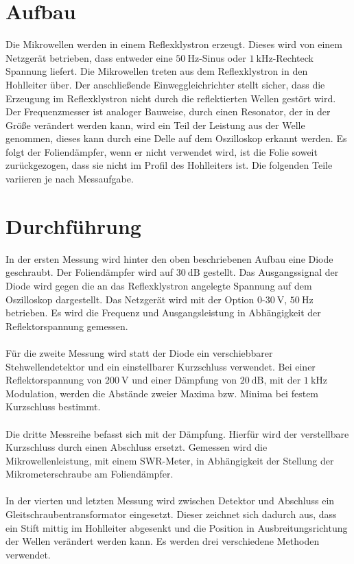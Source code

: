 \section{Aufbau}
\label{sec:Aufbau}
Die Mikrowellen werden in einem Reflexklystron erzeugt.
Dieses wird von einem Netzgerät betrieben, dass entweder eine $\SI{50}{\hertz}$-Sinus oder
$\SI{1}{\kilo\hertz}$-Rechteck Spannung liefert.
Die Mikrowellen treten aus dem Reflexklystron in den Hohlleiter über.
Der anschließende Einweggleichrichter stellt sicher, dass die Erzeugung im Reflexklystron nicht durch die reflektierten
Wellen gestört wird.
Der Frequenzmesser ist analoger Bauweise, durch einen Resonator, der in der Größe verändert werden kann,
wird ein Teil der Leistung aus der Welle genommen, dieses kann durch eine Delle auf dem Oszilloskop erkannt werden.
Es folgt der Foliendämpfer, wenn er nicht verwendet wird, ist die Folie soweit zurückgezogen,
dass sie nicht im Profil des Hohlleiters ist.
Die folgenden Teile variieren je nach Messaufgabe.

\section{Durchführung}
\label{sec:Durchführung}
In der ersten Messung wird hinter den oben beschriebenen Aufbau eine Diode geschraubt.
Der Foliendämpfer wird auf $\SI{30}{\deci\bel}$ gestellt.
Das Ausgangssignal der Diode wird gegen die an das Reflexklystron angelegte Spannung auf dem Oszilloskop dargestellt.
Das Netzgerät wird mit der Option 0-$\SI{30}{\volt}$, $\SI{50}{\hertz}$ betrieben.
Es wird die Frequenz und Ausgangsleistung in Abhängigkeit der Reflektorspannung gemessen.
\\~\\
Für die zweite Messung wird statt der Diode ein verschiebbarer Stehwellendetektor und ein einstellbarer Kurzschluss verwendet.
Bei einer Reflektorspannung von $\SI{200}{\volt}$ und einer Dämpfung von $\SI{20}{\deci\bel}$, mit der $\SI{1}{\kilo\hertz}$
Modulation, werden die Abstände zweier Maxima bzw. Minima bei festem Kurzschluss bestimmt.
\\~\\
Die dritte Messreihe befasst sich mit der Dämpfung. Hierfür wird der verstellbare Kurzschluss durch einen Abschluss ersetzt.
Gemessen wird die Mikrowellenleistung, mit einem SWR-Meter,
in Abhängigkeit der Stellung der Mikrometerschraube am Foliendämpfer.
\\~\\
In der vierten und letzten Messung wird zwischen Detektor und Abschluss ein Gleitschraubentransformator eingesetzt.
Dieser zeichnet sich dadurch aus,
dass ein Stift mittig im Hohlleiter abgesenkt und die Position in Ausbreitungsrichtung der Wellen verändert werden kann.
Es werden drei verschiedene Methoden verwendet.

